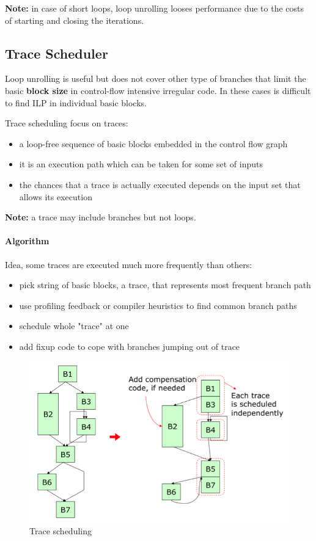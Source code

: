 \textbf{Note:} in case of short loops, loop unrolling looses performance due to the costs of starting and closing the
iterations.

\clearpage
\subsection{Trace Scheduler}\label{subsec:trace-scheduler}
Loop unrolling is useful but does not cover other type of branches that limit the basic \textbf{block size} in
control-flow intensive irregular code.
In these cases is difficult to find ILP in individual basic blocks.

Trace scheduling focus on traces:
\begin{itemize}
    \item a loop-free sequence of basic blocks embedded in the control flow graph
    \item it is an execution path which can be taken for some set of inputs
    \item the chances that a trace is actually executed depends on the input set that allows its execution
\end{itemize}

\textbf{Note:} a trace may include branches but not loops.

\paragraph{Algorithm} Idea, some traces are executed much more frequently than others:
\begin{itemize}
    \item pick string of basic blocks, a trace, that represents most frequent branch path
    \item use profiling feedback or compiler heuristics to find common branch paths
    \item schedule whole "trace" at one
    \item add fixup code to cope with branches jumping out of trace
\end{itemize}
\begin{figure}[h]
    \centering
    \includegraphics[scale = 0.45]{images/trace-scheduling}
    \caption{Trace scheduling}
    \label{fig:trace-scheduling}
\end{figure}

